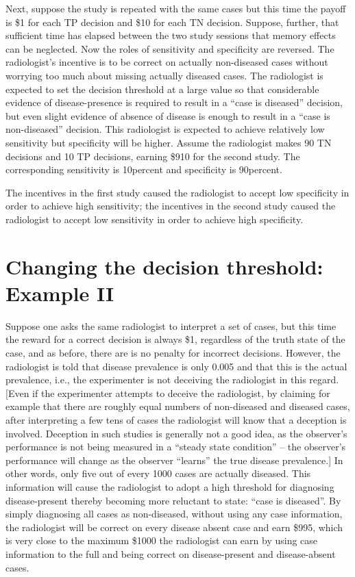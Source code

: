 \documentclass[
]{book}
\begin{document}
Next, suppose the study is repeated with the same cases but this time the payoff is \$1 for each TP decision and \$10 for each TN decision. Suppose, further, that sufficient time has elapsed between the two study sessions that memory effects can be neglected. Now the roles of sensitivity and specificity are reversed. The radiologist's incentive is to be correct on actually non-diseased cases without worrying too much about missing actually diseased cases. The radiologist is expected to set the decision threshold at a large value so that considerable evidence of disease-presence is required to result in a ``case is diseased'' decision, but even slight evidence of absence of disease is enough to result in a ``case is non-diseased'' decision. This radiologist is expected to achieve relatively low sensitivity but specificity will be higher. Assume the radiologist makes 90 TN decisions and 10 TP decisions, earning \$910 for the second study. The corresponding sensitivity is 10percent and specificity is 90percent.

The incentives in the first study caused the radiologist to accept low specificity in order to achieve high sensitivity; the incentives in the second study caused the radiologist to accept low sensitivity in order to achieve high specificity.

\hypertarget{binary-task-model-example-2}{%
\section{Changing the decision threshold: Example II}\label{binary-task-model-example-2}}

Suppose one asks the same radiologist to interpret a set of cases, but this time the reward for a correct decision is always \$1, regardless of the truth state of the case, and as before, there are is no penalty for incorrect decisions. However, the radiologist is told that disease prevalence is only 0.005 and that this is the actual prevalence, i.e., the experimenter is not deceiving the radiologist in this regard. {[}Even if the experimenter attempts to deceive the radiologist, by claiming for example that there are roughly equal numbers of non-diseased and diseased cases, after interpreting a few tens of cases the radiologist will know that a deception is involved. Deception in such studies is generally not a good idea, as the observer's performance is not being measured in a ``steady state condition'' -- the observer's performance will change as the observer ``learns'' the true disease prevalence.{]} In other words, only five out of every 1000 cases are actually diseased. This information will cause the radiologist to adopt a high threshold for diagnosing disease-present thereby becoming more reluctant to state: ``case is diseased''. By simply diagnosing all cases as non-diseased, without using any case information, the radiologist will be correct on every disease absent case and earn \$995, which is very close to the maximum \$1000 the radiologist can earn by using case information to the full and being correct on disease-present and disease-absent cases.
\end{document}
